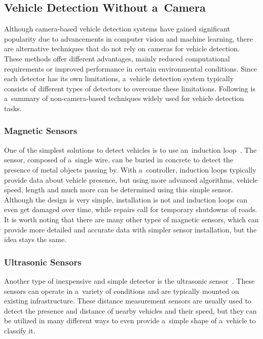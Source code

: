 \subsection{Vehicle Detection Without a~Camera}

Although camera-based vehicle detection systems have gained significant
popularity due to advancements in computer vision and machine learning, there
are alternative techniques that do not rely on cameras for vehicle detection.
These methods offer different advantages, mainly reduced computational
requirements or improved performance in certain environmental conditions. Since
each detector has its own limitations, a~vehicle detection system typically
consists of different types of detectors to overcome these limitations.
Following is a~summary of non-camera-based techniques widely used for vehicle
detection tasks.


\subsubsection*{Magnetic Sensors}

One of the simplest solutions to detect vehicles is to use an~induction
loop~\cite{MagneticSensors}. The sensor, composed of a~single wire, can be buried
in concrete to detect the presence of metal objects passing by. With
a~controller, induction loops typically provide data about vehicle presence, but
using more advanced algorithms, vehicle speed, length and much more
can be determined using this simple sensor. Although the design is very simple,
installation is not and induction loops can even get damaged over time, while
repairs call for temporary shutdowns of roads. It is worth noting that there
are many other types of magnetic sensors, which can provide more detailed and
accurate data with simpler sensor installation, but the idea stays the same.


\subsubsection*{Ultrasonic Sensors}

Another type of inexpensive and simple detector is the ultrasonic
sensor~\cite{UltrasonicSensors}. These sensors can operate in a~variety of
conditions and are typically mounted on existing infrastructure. These distance
measurement sensors are usually used to detect the presence and distance of nearby
vehicles and their speed, but they can be utilized in many different ways to
even provide a~simple shape of a~vehicle to classify it.


